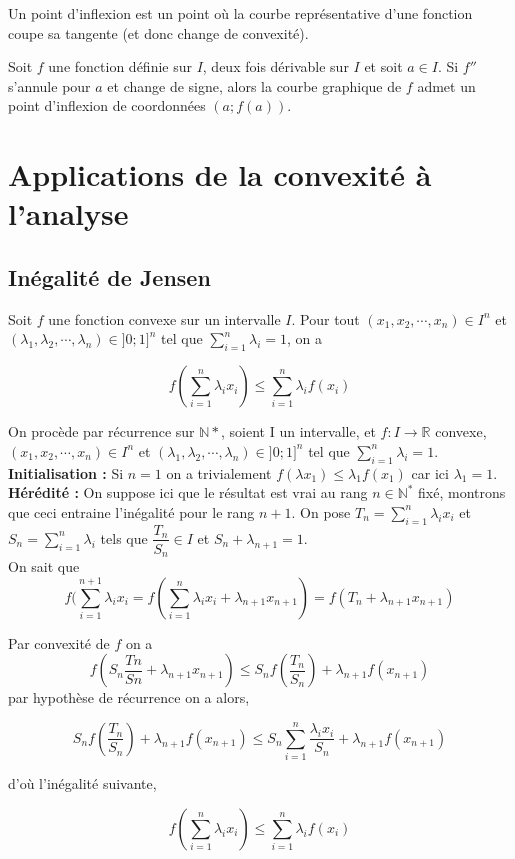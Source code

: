 \documentclass[french]{book}
\newcommand{\ie}{\leq}
\begin{document}
\begin{defn}
Un point d’inflexion est un point où la courbe représentative d’une fonction coupe sa tangente (et donc change de convexité).
\end{defn}

\begin{prop}
Soit $f$ une fonction définie sur $I$, deux fois dérivable sur $I$ et soit $a \in I$.
Si $f''$ s’annule pour $a$ et change de signe, alors la courbe graphique de $f$ admet un point d’inflexion de coordonnées $(a ; f(a))$.
\end{prop}

\newpage
\section{Applications de la convexité à l'analyse}
\subsection{Inégalité de Jensen}


\begin{thm}
Soit $f$ une fonction convexe sur un intervalle $I$. Pour tout $(x_1,x_2, \cdots , x_n) \in I^n $ et $(\lambda_1,\lambda_2, \cdots , \lambda_n) \in ]0;1]^n $ tel que $\sum_{i=1}^n \lambda_i =1$, on a

$$f(\sum_{i=1}^{n} \lambda_i x_i) \ie \sum_{i=1}^n \lambda_i f(x_i)$$
\end{thm}

\begin{demo}
On procède par récurrence sur $\mathbb{N}*$, soient I un intervalle, et $f : I \longrightarrow \mathbb{R}$ 
convexe, $(x_1,x_2, \cdots , x_n) \in I^n $ et $(\lambda_1,\lambda_2, \cdots , \lambda_n) \in ]0;1]^n $ tel que $\sum_{i=1}^n \lambda_i =1$.\\

\textbf{Initialisation :} Si $n=1$ on a trivialement $f(\lambda x_1)\ie \lambda_1f(x_1)$ car ici $\lambda_1=1$.\\

\textbf{Hérédité : }On suppose ici que le résultat est vrai au rang $n \in \mathbb{N}^*$ fixé, montrons que ceci entraine l’inégalité pour le rang $n + 1$. On pose $T_n = \sum_{i=1}^n \lambda_i x_i $ et $S_n=\sum_{i=1}^n \lambda_i$  tels que $\dfrac{T_n}{S_n} \in I$ et $S_n + \lambda_{n+1} =1$.\\

On sait que 
$$f(\sum_{i=1}^{n+1} \lambda_i x_i =f( \sum_{i=1}^{n} \lambda_i x_i + \lambda_{n+1} x_{n+1} ) = f(T_n+ \lambda_{n+1} x_{n+1} )$$

Par convexité de $f$ on  a
$$f(S_n\dfrac{Tn}{Sn} + \lambda_{n+1} x_{n+1} ) \ie S_n f( \dfrac{T_n}{S_n}) + \lambda_{n+1} f(x_{n+1})$$ 
par hypothèse de récurrence on a alors,

$$ S_n f( \dfrac{T_n}{S_n}) + \lambda_{n+1} f(x_{n+1}) \ie S_n \sum_{i=1}^n \dfrac{\lambda_i x_i}{S_n} +  \lambda_{n+1} f(x_{n+1})$$

d'où l'inégalité suivante, 

$$f(\sum_{i=1}^{n} \lambda_i x_i) \ie \sum_{i=1}^n \lambda_i f(x_i)$$

\end{demo}
\end{document}
